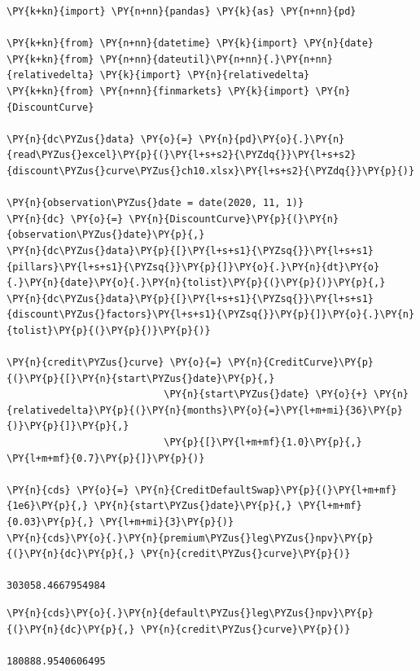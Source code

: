 \begin{tcolorbox}[breakable, size=fbox, boxrule=1pt, pad at break*=1mm,colback=cellbackground, colframe=cellborder]
\begin{Verbatim}[commandchars=\\\{\}]
\PY{k+kn}{import} \PY{n+nn}{pandas} \PY{k}{as} \PY{n+nn}{pd}
	
\PY{k+kn}{from} \PY{n+nn}{datetime} \PY{k}{import} \PY{n}{date}
\PY{k+kn}{from} \PY{n+nn}{dateutil}\PY{n+nn}{.}\PY{n+nn}{relativedelta} \PY{k}{import} \PY{n}{relativedelta}
\PY{k+kn}{from} \PY{n+nn}{finmarkets} \PY{k}{import} \PY{n}{DiscountCurve}
	
\PY{n}{dc\PYZus{}data} \PY{o}{=} \PY{n}{pd}\PY{o}{.}\PY{n}{read\PYZus{}excel}\PY{p}{(}\PY{l+s+s2}{\PYZdq{}}\PY{l+s+s2}{discount\PYZus{}curve\PYZus{}ch10.xlsx}\PY{l+s+s2}{\PYZdq{}}\PY{p}{)}

\PY{n}{observation\PYZus{}date = date(2020, 11, 1)}        
\PY{n}{dc} \PY{o}{=} \PY{n}{DiscountCurve}\PY{p}{(}\PY{n}{observation\PYZus{}date}\PY{p}{,} 
\PY{n}{dc\PYZus{}data}\PY{p}{[}\PY{l+s+s1}{\PYZsq{}}\PY{l+s+s1}{pillars}\PY{l+s+s1}{\PYZsq{}}\PY{p}{]}\PY{o}{.}\PY{n}{dt}\PY{o}{.}\PY{n}{date}\PY{o}{.}\PY{n}{tolist}\PY{p}{(}\PY{p}{)}\PY{p}{,}
\PY{n}{dc\PYZus{}data}\PY{p}{[}\PY{l+s+s1}{\PYZsq{}}\PY{l+s+s1}{discount\PYZus{}factors}\PY{l+s+s1}{\PYZsq{}}\PY{p}{]}\PY{o}{.}\PY{n}{tolist}\PY{p}{(}\PY{p}{)}\PY{p}{)}

\PY{n}{credit\PYZus{}curve} \PY{o}{=} \PY{n}{CreditCurve}\PY{p}{(}\PY{p}{[}\PY{n}{start\PYZus{}date}\PY{p}{,} 
                           \PY{n}{start\PYZus{}date} \PY{o}{+} \PY{n}{relativedelta}\PY{p}{(}\PY{n}{months}\PY{o}{=}\PY{l+m+mi}{36}\PY{p}{)}\PY{p}{]}\PY{p}{,} 
                           \PY{p}{[}\PY{l+m+mf}{1.0}\PY{p}{,} \PY{l+m+mf}{0.7}\PY{p}{]}\PY{p}{)}

\PY{n}{cds} \PY{o}{=} \PY{n}{CreditDefaultSwap}\PY{p}{(}\PY{l+m+mf}{1e6}\PY{p}{,} \PY{n}{start\PYZus{}date}\PY{p}{,} \PY{l+m+mf}{0.03}\PY{p}{,} \PY{l+m+mi}{3}\PY{p}{)}
\PY{n}{cds}\PY{o}{.}\PY{n}{premium\PYZus{}leg\PYZus{}npv}\PY{p}{(}\PY{n}{dc}\PY{p}{,} \PY{n}{credit\PYZus{}curve}\PY{p}{)}

303058.4667954984
\end{Verbatim}
\end{tcolorbox}

\begin{tcolorbox}[breakable, size=fbox, boxrule=1pt, pad at break*=1mm,colback=cellbackground, colframe=cellborder]
\begin{Verbatim}[commandchars=\\\{\}]
\PY{n}{cds}\PY{o}{.}\PY{n}{default\PYZus{}leg\PYZus{}npv}\PY{p}{(}\PY{n}{dc}\PY{p}{,} \PY{n}{credit\PYZus{}curve}\PY{p}{)}

180888.9540606495
\end{Verbatim}
\end{tcolorbox}

